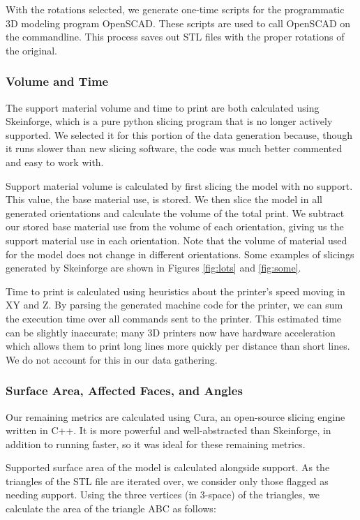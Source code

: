 \documentclass{sigchi}
\begin{document}
With the rotations selected, we generate one-time scripts for the programmatic 3D modeling program OpenSCAD.  These scripts are used to call OpenSCAD on the commandline.  This process saves out STL files with the proper rotations of the original.

\subsubsection{Volume and Time}
The support material volume and time to print are both calculated using Skeinforge, which is a pure python slicing program that is no longer actively supported.  We selected it for this portion of the data generation because, though it runs slower than new slicing software, the code was much better commented and easy to work with.

Support material volume is calculated by first slicing the model with no support.  This value, the base material use, is stored.  We then slice the model in all generated orientations and calculate the volume of the total print.  We subtract our stored base material use from the volume of each orientation, giving us the support material use in each orientation.  Note that the volume of material used for the model does not change in different orientations.  Some examples of slicings generated by Skeinforge are shown in Figures \ref{fig:lots} and \ref{fig:some}.

Time to print is calculated using heuristics about the printer's speed moving in XY and Z.  By parsing the generated machine code for the printer, we can sum the execution time over all commands sent to the printer.  This estimated time can be slightly inaccurate; many 3D printers now have hardware acceleration which allows them to print long lines more quickly per distance than short lines. We do not account for this in our data gathering.

\subsubsection{Surface Area, Affected Faces, and Angles}
Our remaining metrics are calculated using Cura, an open-source slicing engine written in C++.  It is more powerful and well-abstracted than Skeinforge, in addition to running faster, so it was ideal for these remaining metrics.

Supported surface area of the model is calculated alongside support.  As the triangles of the STL file are iterated over, we consider only those flagged as needing support.  Using the three vertices (in 3-space) of the triangles, we calculate the area of the triangle ABC as follows:
\end{document}
